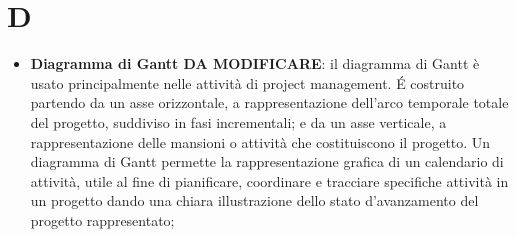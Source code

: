 \section{D}
\begin{itemize} 
	\item
	\textbf{Diagramma di Gantt DA MODIFICARE}: il diagramma di Gantt è usato principalmente nelle attività di project management. \'E costruito partendo da un asse orizzontale, a rappresentazione dell'arco temporale totale del progetto, suddiviso in fasi incrementali; e da un asse verticale, a rappresentazione delle mansioni o attività che costituiscono il progetto.
	Un diagramma di Gantt permette la rappresentazione grafica di un calendario di attività, utile al fine di pianificare, coordinare e tracciare specifiche attività in un progetto dando una chiara illustrazione dello stato d'avanzamento del progetto rappresentato;
 
\end{itemize}